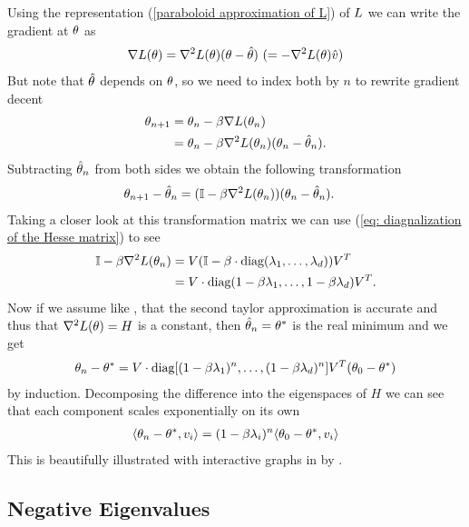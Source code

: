 Using the representation (\ref{paraboloid approximation of L}) of \(L\) we
can write the gradient at \(\theta\) as
%
\begin{align*}
	\nabla L(\theta)
	=  \nabla^2 L(\theta)(\theta-\hat{\theta})
	\ (= -\nabla^2 L(\theta)\hat{v})
\end{align*}
%
But note that \(\hat{\theta}\) depends on \(\theta\), so we need to index both
by \(n\) to rewrite gradient decent
%
\begin{align*}
	\theta_{n+1} &= \theta_n - \beta\nabla L(\theta_n)\\
	&= \theta_n - \beta\nabla^2 L(\theta_n)(\theta_n - \hat{\theta}_n).
\end{align*}
%
Subtracting \(\hat{\theta}_n\) from both sides we obtain the following
transformation 
%
\begin{align}\label{eq: Matrix GD Formulation}
	\theta_{n+1} - \hat{\theta}_n
	&= (\mathbb{I} - \beta\nabla^2 L(\theta_n) ) (\theta_n - \hat{\theta}_n).
\end{align}
%
Taking a closer look at this transformation matrix we can use (\ref{eq:
diagnalization of the Hesse matrix}) to see
%
\begin{align*}
	\mathbb{I} - \beta\nabla^2 L(\theta_n)
	&= V(\mathbb{I} - \beta\cdot\text{diag}(\lambda_1,\dots,\lambda_d) )V^T \\
	&= V\cdot\text{diag}(1-\beta\lambda_1, \dots,1-\beta\lambda_d)V^T.
\end{align*}
%
Now if we assume like \textcite{gohWhyMomentumReally2017}, that the second
taylor approximation is accurate and thus that \(\nabla^2 L(\theta)=H\) is a
constant, then \(\hat{\theta}_n = \theta^*\) is the real minimum and we get
%
\begin{align}
	\theta_n - \theta^*
	= V\cdot\text{diag}[(1-\beta\lambda_1)^n,\dots,(1-\beta\lambda_d)^n] V^T (\theta_0 - \theta^*)
\end{align}
%
by induction. Decomposing the difference into the eigenspaces of \(H\) we can 
see that each component scales exponentially on its own 
%
\begin{align*}
	\langle \theta_n -\theta^*, v_i\rangle
	= (1-\beta\lambda_i)^n \langle \theta_0 - \theta^*, v_i\rangle
\end{align*}
%
This is beautifully illustrated with interactive graphs in
 by \citeauthor{gohWhyMomentumReally2017}.

\subsection{Negative Eigenvalues}\label{subsec: Negative Eigenvalues}

